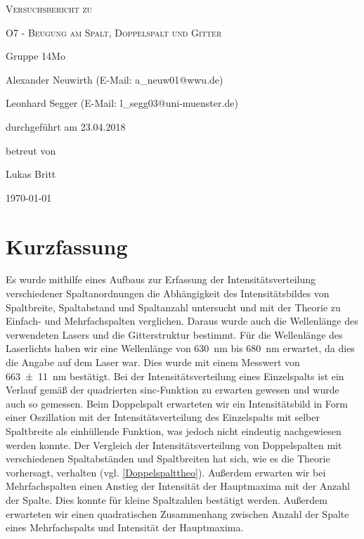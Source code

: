 \documentclass[
	a4paper,
	12pt,
	pagesize,
	ngerman
]{scrartcl}
\begin{document}
	
	\begin{titlepage}
		\centering
		{\scshape\LARGE Versuchsbericht zu \par}
		\vspace{1cm}
		{\scshape\huge O7 - Beugung am Spalt, Doppelspalt und Gitter \par}
		\vspace{2.5cm}
		{\LARGE Gruppe 14Mo \par}
		\vspace{0.5cm}
		
		{\large Alexander Neuwirth (E-Mail: a\_neuw01@wwu.de) \par}
		{\large Leonhard Segger (E-Mail: l\_segg03@uni-muenster.de) \par}
		\vfill
		
		durchgeführt am 23.04.2018\par
		betreut von\par
		{\large Lukas Britt}
		
		\vfill
		
		{\large \today\par}
	\end{titlepage}
	\tableofcontents
	\newpage

	\section{Kurzfassung}
	
	Es wurde mithilfe eines Aufbaus zur Erfassung der Intensitätsverteilung verschiedener Spaltanordnungen die Abhängigkeit des Intensitätsbildes von Spaltbreite, Spaltabstand und Spaltanzahl untersucht und mit der Theorie zu Einfach- und Mehrfachspalten verglichen.
	Daraus wurde auch die Wellenlänge des verwendeten Lasers und die Gitterstruktur bestimmt.
	Für die Wellenlänge des Laserlichts haben wir eine Wellenlänge von \SI{630}{\nano \meter} bis \SI{680}{\nano \meter} erwartet, da dies die Angabe auf dem Laser war.
	Dies wurde mit einem Messwert von \SI{663 \pm 11}{nm} bestätigt.
	Bei der Intensitätsverteilung eines Einzelspalts ist ein Verlauf gemäß der quadrierten sinc-Funktion zu erwarten gewesen und wurde auch so gemessen.
	Beim Doppelspalt erwarteten wir ein Intensitätsbild in Form einer Oszillation mit der Intensitätsverteilung des Einzelspalts mit selber Spaltbreite als einhüllende Funktion, was jedoch nicht eindeutig nachgewiesen werden konnte.
	Der Vergleich der Intensitätsverteilung von Doppelspalten mit verschiedenen Spaltabständen und Spaltbreiten hat sich, wie es die Theorie vorhersagt, verhalten (vgl. \cref{Doppelspalttheo}). 
	Außerdem erwarten wir bei Mehrfachspalten einen Anstieg der Intensität der Hauptmaxima mit der Anzahl der Spalte.
	Dies konnte für kleine Spaltzahlen bestätigt werden.
	Außerdem erwarteten wir einen quadratischen Zusammenhang zwischen Anzahl der Spalte eines Mehrfachspalts und Intensität der Hauptmaxima.
	
\end{document}
